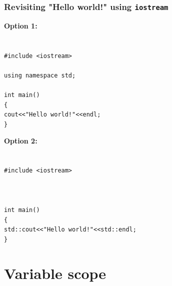 \documentclass{if-beamer}
\begin{document}
\begin{frame}
\frametitle{Revisiting "Hello world!" using \texttt{iostream}}
\begin{minipage}[t]{0.5\textwidth}
	\textbf{Option 1:}\\
	{\texttt{}}\\
	{\texttt{}}\\
	{ \texttt{\#include <iostream>}} \\
	{\texttt{}}\\
	{ \texttt{using namespace std;}} \\
	{\texttt{}}\\
	{ \texttt{int main()}} \\
	{ \texttt{\{}} \\
	{ \texttt{\quad \quad  cout<<"Hello world!"<<endl;}} \\
	{ \texttt{\}}} \\
\end{minipage}
\begin{minipage}[t]{0.8\textwidth}
	\textbf{Option 2:}\\
	{\texttt{}}\\
	{\texttt{}}\\
	{ \texttt{\#include <iostream>}} \\
	{\texttt{}}\\
	{\texttt{}}\\
	{\texttt{}}\\
	{ \texttt{int main()}} \\
	{ \texttt{\{}} \\
	{ \texttt{\quad \quad  std::cout<<"Hello world!"<<std::endl;}} \\
	{\footnotesize \texttt{\}}} \\
\end{minipage}

\end{frame}


\section{Variable scope}
\end{document}
